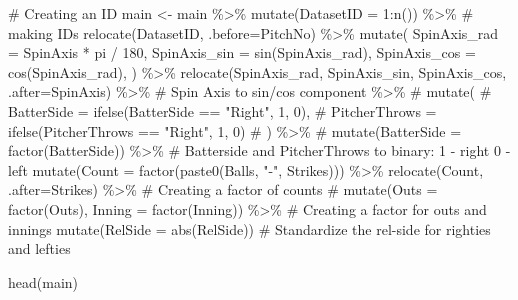 \documentclass[
  letterpaper,
  DIV=11,
  numbers=noendperiod]{scrartcl}
\newenvironment{Shaded}{\begin{snugshade}}{\end{snugshade}}
\newcommand{\AttributeTok}[1]{\textcolor[rgb]{0.40,0.45,0.13}{#1}}
\newcommand{\CommentTok}[1]{\textcolor[rgb]{0.37,0.37,0.37}{#1}}
\newcommand{\DecValTok}[1]{\textcolor[rgb]{0.68,0.00,0.00}{#1}}
\newcommand{\FunctionTok}[1]{\textcolor[rgb]{0.28,0.35,0.67}{#1}}
\newcommand{\NormalTok}[1]{\textcolor[rgb]{0.00,0.23,0.31}{#1}}
\newcommand{\OtherTok}[1]{\textcolor[rgb]{0.00,0.23,0.31}{#1}}
\newcommand{\SpecialCharTok}[1]{\textcolor[rgb]{0.37,0.37,0.37}{#1}}
\newcommand{\StringTok}[1]{\textcolor[rgb]{0.13,0.47,0.30}{#1}}
\begin{document}
\begin{Shaded}
\begin{Highlighting}[]
\CommentTok{\# Creating an ID}
\NormalTok{main }\OtherTok{\textless{}{-}}\NormalTok{ main }\SpecialCharTok{\%\textgreater{}\%}
  \FunctionTok{mutate}\NormalTok{(}\AttributeTok{DatasetID =} \DecValTok{1}\SpecialCharTok{:}\FunctionTok{n}\NormalTok{()) }\SpecialCharTok{\%\textgreater{}\%} \CommentTok{\# making IDs}
  \FunctionTok{relocate}\NormalTok{(DatasetID, }\AttributeTok{.before=}\NormalTok{PitchNo) }\SpecialCharTok{\%\textgreater{}\%}
  \FunctionTok{mutate}\NormalTok{(}
    \AttributeTok{SpinAxis\_rad =}\NormalTok{ SpinAxis }\SpecialCharTok{*}\NormalTok{ pi }\SpecialCharTok{/} \DecValTok{180}\NormalTok{,}
    \AttributeTok{SpinAxis\_sin =} \FunctionTok{sin}\NormalTok{(SpinAxis\_rad),}
    \AttributeTok{SpinAxis\_cos =} \FunctionTok{cos}\NormalTok{(SpinAxis\_rad),}
\NormalTok{  ) }\SpecialCharTok{\%\textgreater{}\%}
  \FunctionTok{relocate}\NormalTok{(SpinAxis\_rad, SpinAxis\_sin, SpinAxis\_cos, }\AttributeTok{.after=}\NormalTok{SpinAxis) }\SpecialCharTok{\%\textgreater{}\%} \CommentTok{\# Spin Axis to sin/cos component \%\textgreater{}\% }
  \CommentTok{\# mutate(}
  \CommentTok{\#   BatterSide = ifelse(BatterSide == "Right", 1, 0),}
  \CommentTok{\#   PitcherThrows = ifelse(PitcherThrows == "Right", 1, 0)}
  \CommentTok{\# ) \%\textgreater{}\%}
  \CommentTok{\# mutate(BatterSide = factor(BatterSide)) \%\textgreater{}\% \# Batterside and PitcherThrows to binary: 1 {-} right 0 {-} left}
  \FunctionTok{mutate}\NormalTok{(}\AttributeTok{Count =} \FunctionTok{factor}\NormalTok{(}\FunctionTok{paste0}\NormalTok{(Balls, }\StringTok{"{-}"}\NormalTok{, Strikes))) }\SpecialCharTok{\%\textgreater{}\%}
  \FunctionTok{relocate}\NormalTok{(Count, }\AttributeTok{.after=}\NormalTok{Strikes) }\SpecialCharTok{\%\textgreater{}\%} \CommentTok{\# Creating a factor of counts}
  \CommentTok{\# mutate(Outs = factor(Outs), Inning = factor(Inning)) \%\textgreater{}\% \# Creating a factor for outs and innings}
  \FunctionTok{mutate}\NormalTok{(}\AttributeTok{RelSide =} \FunctionTok{abs}\NormalTok{(RelSide)) }\CommentTok{\# Standardize the rel{-}side for righties and lefties}
\end{Highlighting}
\end{Shaded}

\begin{Shaded}
\begin{Highlighting}[]
\FunctionTok{head}\NormalTok{(main)}
\end{Highlighting}
\end{Shaded}
\end{document}
